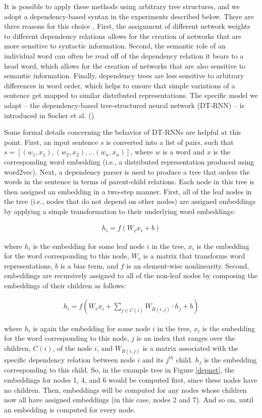 \documentclass[utf8]{frontiersSCNS} %
\begin{document}
It is possible to apply these methods using arbitrary tree structures, and we adopt a dependency-based syntax in the experiments described below. There are three reasons for this choice \citep{Socher:2014}. First, the assignment of different network weights to different dependency relations allows for the creation of networks that are more sensitive to syntactic information. Second, the semantic role of an individual word can often be read off of the dependency relation it bears to a head word, which allows for the creation of networks that are also sensitive to semantic information. Finally, dependency trees are less sensitive to arbitrary differences in word order, which helps to ensure that simple variations of a sentence get mapped to similar distributed representations. The specific model we adapt -- the dependency-based tree-structured neural network (DT-RNN) -- is introduced in Socher et al. (\citeyear{Socher:2014})

Some formal details concerning the behavior of DT-RNNs are helpful at this point. First, an input sentence $s$ is converted into a list of pairs, such that $s = [(w_1, x_1), (w_2, x_2),...(w_n, x_n)]$, where $w$ is a word and $x$ is the corresponding word embedding (i.e., a distributed representation produced using word2vec). Next, a dependency parser is used to produce a tree that orders the words in the sentence in terms of parent-child relations. Each node in this tree is then assigned an embedding in a two-step manner. First, all of the leaf nodes in the tree (i.e., nodes that do not depend on other nodes) are assigned embeddings by applying a simple transformation to their underlying word embeddings:

\begin{align} 
h_i = f (W_v x_i + b) 
\end{align}

\noindent
where $h_i$ is the embedding for some leaf node $i$ in the tree, $x_i$ is the embedding for the word corresponding to this node, $W_v$ is a matrix that transforms word representations, $b$ is a bias term, and $f$ is an element-wise nonlinearity. Second, embeddings are recursively assigned to all of the non-leaf nodes by composing the embeddings of their children as follows:

\begin{align}
h_i = f (W_v x_i + \sum_{j \in C(i)} W_{R(i,j)} \cdot h_j + b)
\end{align}

\noindent
where $h_i$ is again the embedding for some node $i$ in the tree, $x_i$ is the embedding for the word corresponding to this node, $j$ is an index that ranges over the children, $C(i)$, of the node $i$, and $W_{R(i, j)}$ is a matrix associated with the specific dependency relation between node $i$ and its $j^{th}$ child. $h_j$ is the embedding corresponding to this child. So, in the example tree in Figure \ref{depnet}, the embeddings for nodes 1, 4, and 6 would be computed first, since these nodes have no children. Then, embeddings will be computed for any nodes whose children now all have assigned embeddings (in this case, nodes 2 and 7). And so on, until an embedding is computed for every node.
\end{document}
